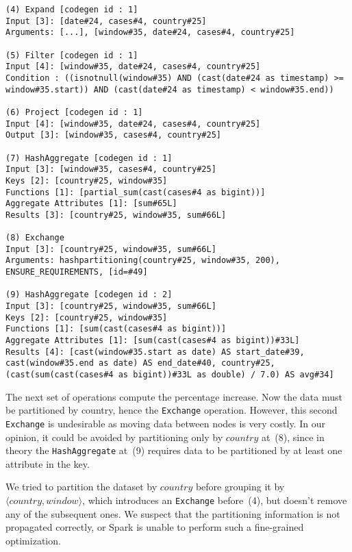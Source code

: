 \begin{lstlisting}[style=sparkplan]
(4) Expand [codegen id : 1]
Input [3]: [date#24, cases#4, country#25]
Arguments: [...], [window#35, date#24, cases#4, country#25]

(5) Filter [codegen id : 1]
Input [4]: [window#35, date#24, cases#4, country#25]
Condition : ((isnotnull(window#35) AND (cast(date#24 as timestamp) >= window#35.start)) AND (cast(date#24 as timestamp) < window#35.end))

(6) Project [codegen id : 1]
Input [4]: [window#35, date#24, cases#4, country#25]
Output [3]: [window#35, cases#4, country#25]

(7) HashAggregate [codegen id : 1]
Input [3]: [window#35, cases#4, country#25]
Keys [2]: [country#25, window#35]
Functions [1]: [partial_sum(cast(cases#4 as bigint))]
Aggregate Attributes [1]: [sum#65L]
Results [3]: [country#25, window#35, sum#66L]

(8) Exchange
Input [3]: [country#25, window#35, sum#66L]
Arguments: hashpartitioning(country#25, window#35, 200), ENSURE_REQUIREMENTS, [id=#49]

(9) HashAggregate [codegen id : 2]
Input [3]: [country#25, window#35, sum#66L]
Keys [2]: [country#25, window#35]
Functions [1]: [sum(cast(cases#4 as bigint))]
Aggregate Attributes [1]: [sum(cast(cases#4 as bigint))#33L]
Results [4]: [cast(window#35.start as date) AS start_date#39, cast(window#35.end as date) AS end_date#40, country#25, (cast(sum(cast(cases#4 as bigint))#33L as double) / 7.0) AS avg#34]
\end{lstlisting}

\noindent
The next set of operations compute the percentage increase.
Now the data must be partitioned by country, hence the \texttt{Exchange} operation.
However, this second \texttt{Exchange} is undesirable as moving data between nodes is very costly. In our opinion, it could be avoided by partitioning only by $country$ at~(8), since in theory the \texttt{HashAggregate} at~(9) requires data to be partitioned by at least one attribute in the key.

We tried to partition the dataset by $country$ before grouping it by $\langle country, window\rangle$, which introduces an \texttt{Exchange} before~(4), but doesn't remove any of the subsequent ones. We suspect that the partitioning information is not propagated correctly, or Spark is unable to perform such a fine-grained optimization.

